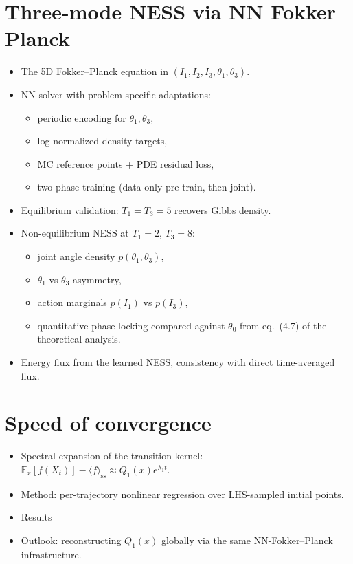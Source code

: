\documentclass[11pt]{article}
\begin{document}
\section{Three-mode NESS via NN Fokker--Planck}
\begin{itemize}
  \item The 5D Fokker--Planck equation in $(I_1, I_2, I_3, \theta_1,
        \theta_3)$.
  \item NN solver with problem-specific
        adaptations:
    \begin{itemize}
      \item periodic encoding for $\theta_1, \theta_3$,
      \item log-normalized density targets,
      \item MC reference points + PDE residual loss,
      \item two-phase training (data-only pre-train, then joint).
    \end{itemize}
  \item Equilibrium validation: $T_1 = T_3 = 5$ recovers Gibbs density.
  \item Non-equilibrium NESS at $T_1 = 2$, $T_3 = 8$:
    \begin{itemize}
      \item joint angle density $p(\theta_1, \theta_3)$,
      \item $\theta_1$ vs $\theta_3$ asymmetry,
      \item action marginals $p(I_1)$ vs $p(I_3)$,
      \item quantitative phase locking compared against $\theta_0$
            from eq.~(4.7) of the theoretical analysis.
    \end{itemize}
  \item Energy flux from the learned NESS, consistency with direct
        time-averaged flux.
\end{itemize}

\section{Speed of convergence}
\begin{itemize}
  \item Spectral expansion of the transition kernel:
        $\mathbb{E}_x[f(X_t)] - \langle f \rangle_{\text{ss}} \approx
        Q_1(x) e^{\lambda_1 t}$.
  \item Method: per-trajectory nonlinear regression over LHS-sampled
        initial points.
  \item Results 
  \item Outlook: reconstructing $Q_1(x)$ globally via the same
        NN-Fokker--Planck infrastructure.
\end{itemize}
\end{document}
